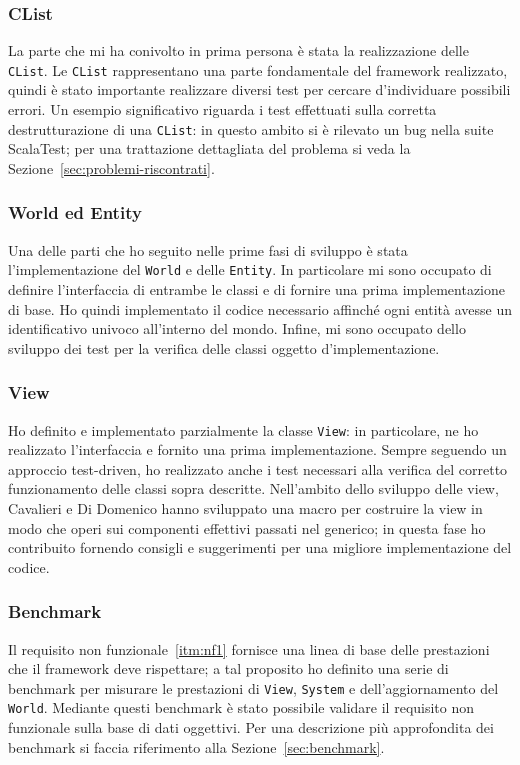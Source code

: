\subsubsection{CList}
La parte che mi ha conivolto in prima persona è stata la realizzazione delle \texttt{CList}.
Le \texttt{CList} rappresentano una parte fondamentale del framework realizzato, quindi è stato importante realizzare
diversi test per cercare d'individuare possibili errori.
Un esempio significativo riguarda i test effettuati sulla corretta destrutturazione di una \texttt{CList}: in questo
ambito si è rilevato un bug nella suite ScalaTest;
per una trattazione dettagliata del problema si veda la Sezione~\ref{sec:problemi-riscontrati}.

\subsubsection{World ed Entity}
Una delle parti che ho seguito nelle prime fasi di sviluppo è stata l'implementazione del \texttt{World} e delle
\texttt{Entity}.
In particolare mi sono occupato di definire l'interfaccia di entrambe le classi e di fornire una prima implementazione
di base.
Ho quindi implementato il codice necessario affinché ogni entità avesse un identificativo univoco all'interno del mondo.
Infine, mi sono occupato dello sviluppo dei test per la verifica delle classi oggetto d'implementazione.

\subsubsection{View}
Ho definito e implementato parzialmente la classe \texttt{View}: in particolare, ne ho realizzato l'interfaccia e
fornito una prima implementazione.
Sempre seguendo un approccio test-driven, ho realizzato anche i test necessari alla verifica del corretto funzionamento
delle classi sopra descritte.
Nell'ambito dello sviluppo delle view, Cavalieri e Di Domenico hanno sviluppato una macro per costruire la
view in modo che operi sui componenti effettivi passati nel generico;
in questa fase ho contribuito fornendo consigli e suggerimenti per una migliore implementazione del codice.

\subsubsection{Benchmark}
Il requisito non funzionale~\ref{itm:nf1} fornisce una linea di base delle prestazioni che il framework deve rispettare;
a tal proposito ho definito una serie di benchmark per misurare le prestazioni di \texttt{View}, \texttt{System} e
dell'aggiornamento del \texttt{World}.
Mediante questi benchmark è stato possibile validare il requisito non funzionale sulla base di dati oggettivi.
Per una descrizione più approfondita dei benchmark si faccia riferimento alla Sezione~\ref{sec:benchmark}.

